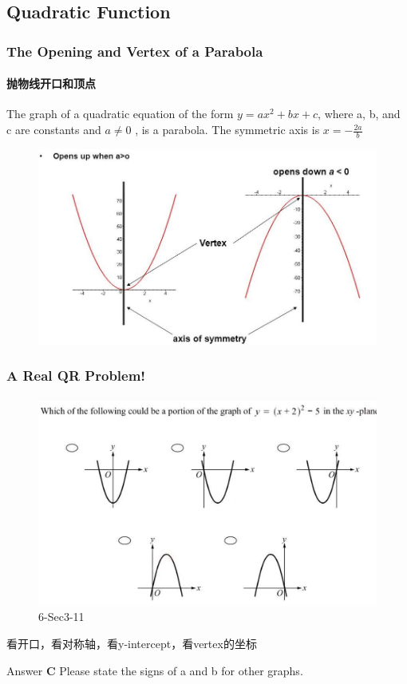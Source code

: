 \documentclass[
	11pt, %
	handout,
]{beamer}
\begin{document}
\subsection{Quadratic Function}



\begin{frame}
	\frametitle{The Opening and Vertex of a Parabola}
	\framesubtitle{抛物线开口和顶点}
			\begin{definition}
		The graph of a quadratic equation of the form $y = ax^2 + bx +c $, where a, b, and c are constants and $a\neq 0$ , is a \alert{parabola}. The symmetric axis is  $x= -\frac{2a}{b}$
			\end{definition}

			\begin{figure}
				\includegraphics[width=0.6\linewidth]{Parabola.jpeg}
			\end{figure}

\end{frame}


\begin{frame}
	\frametitle{A Real QR Problem!}
	\framesubtitle{}

	\begin{figure}
		\includegraphics[width=\linewidth]{Parabola_Example_Question1.png}
		\caption{6-Sec3-11}
	\end{figure}

	\pause

看开口，看对称轴，看y-intercept，看vertex的坐标 \\

\pause

\bigskip
Answer \textbf{C } \pause Please state the signs of a and b for other graphs.

\end{frame}
\end{document}
